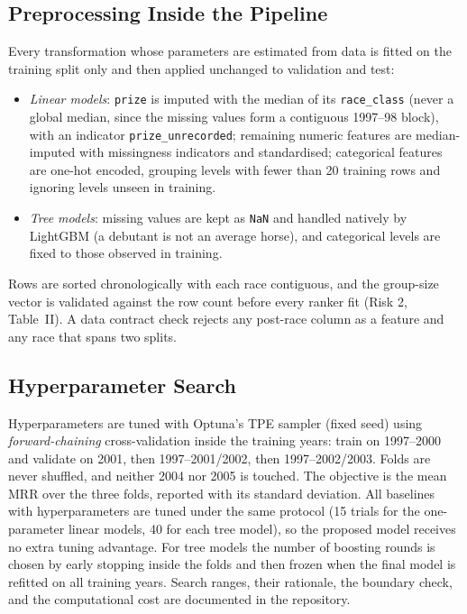 \subsection{Preprocessing Inside the Pipeline}

Every transformation whose parameters are estimated from data is fitted on the
training split only and then applied unchanged to validation and test:

\begin{itemize}
  \item \emph{Linear models}: \texttt{prize} is imputed with the median of its
        \texttt{race\_class} (never a global median, since the missing values
        form a contiguous 1997--98 block), with an indicator
        \texttt{prize\_unrecorded}; remaining numeric features are
        median-imputed with missingness indicators and standardised;
        categorical features are one-hot encoded, grouping levels with fewer
        than 20 training rows and ignoring levels unseen in training.
  \item \emph{Tree models}: missing values are kept as \texttt{NaN} and handled
        natively by LightGBM (a debutant is not an average horse), and
        categorical levels are fixed to those observed in training.
\end{itemize}

Rows are sorted chronologically with each race contiguous, and the group-size
vector is validated against the row count before every ranker fit (Risk 2,
Table~II). A data contract check rejects any post-race column as a feature and
any race that spans two splits.

\subsection{Hyperparameter Search}

Hyperparameters are tuned with Optuna's TPE sampler (fixed seed) using
\emph{forward-chaining} cross-validation inside the training years: train on
1997--2000 and validate on 2001, then 1997--2001/2002, then 1997--2002/2003.
Folds are never shuffled, and neither 2004 nor 2005 is touched. The objective
is the mean MRR over the three folds, reported with its standard deviation. All
baselines with hyperparameters are tuned under the same protocol (15 trials for
the one-parameter linear models, 40 for each tree model), so the proposed model
receives no extra tuning advantage. For tree models the number of boosting
rounds is chosen by early stopping inside the folds and then frozen when the
final model is refitted on all training years. Search ranges, their rationale,
the boundary check, and the computational cost are documented in the
repository.

